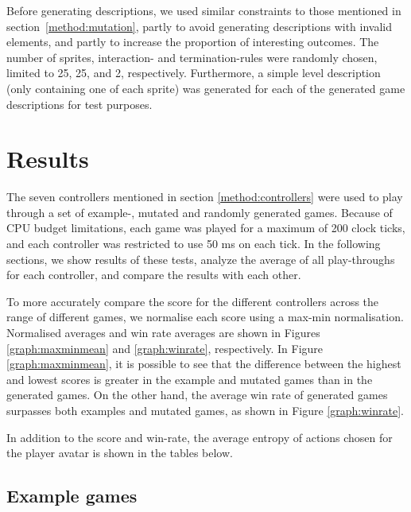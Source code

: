 \documentclass{llncs}
\begin{document}
Before generating descriptions, we used similar constraints to those mentioned in section~\ref{method:mutation}, partly to avoid generating descriptions with invalid elements, and partly to increase the proportion of interesting outcomes. 
The number of sprites, interaction- and termination-rules were randomly chosen, limited to 25, 25, and 2, respectively. Furthermore, a simple level description (only containing one of each sprite) was generated for each of the generated game descriptions for test purposes. 



\section{Results}
\label{sec:result}
The seven controllers mentioned in section \ref{method:controllers} were used to play through a set of example-, mutated and randomly generated games. Because of CPU budget limitations, each game was played for a maximum of 200 clock ticks, and each controller was restricted to use 50 ms on each tick. In the following sections, we show results of these tests, analyze the average of all play-throughs for each controller, and compare the results with each other.

To more accurately compare the score for the different controllers across the range of different games, we normalise each score using a max-min normalisation. 
Normalised averages and win rate averages are shown in Figures \ref{graph:maxminmean} and \ref{graph:winrate}, respectively. In Figure \ref{graph:maxminmean}, it is possible to see that the difference between the highest and lowest scores is greater in the example and mutated games than in the generated games. On the other hand, the average win rate of generated games surpasses both examples and mutated games, as shown in Figure \ref{graph:winrate}.

In addition to the score and win-rate, the average entropy of actions chosen for the player avatar is shown in the tables below.

\subsection{Example games}
\end{document}
